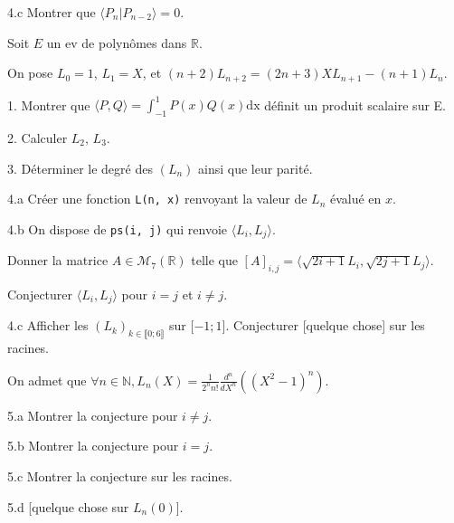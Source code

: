 \vspace{5pt}
4.c  Montrer que $\langle P_n | P_{n-2} \rangle = 0$.



\subetoiles
\columnbreak



\noindent Soit $E$ un ev de polynômes dans $\mathbb{R}$.

\noindent On pose $L_0 = 1$, $L_1 = X$, et $(n+2)L_{n+2} = (2n+3)XL_{n+1} - (n+1)L_n$.

\vspace{5pt}
1. Montrer que $\displaystyle \langle P, Q\rangle = \int_{-1}^{1} P(x)Q(x)\mathrm{dx}$ définit un produit scalaire sur E.

\vspace{5pt}
2. Calculer $L_2$, $L_3$.

\vspace{5pt}
3. Déterminer le degré des $(L_n)$ ainsi que leur parité.

\vspace{5pt}
4.a Créer une fonction \lstinline {L(n, x)} renvoyant la valeur de $L_n$ évalué en $x$.

\vspace{5pt}
4.b On dispose de \lstinline {ps(i, j)} qui renvoie $\langle L_i, L_j\rangle$.

Donner la matrice $A \in \mathcal{M}_7(\mathbb{R})$ telle que
$[A]_{i,j} = \langle\sqrt{2i+1}L_i, \sqrt{2j+1}L_j\rangle$.

Conjecturer $\langle L_i, L_j\rangle$ pour $i=j$ et $i \neq j$.

\vspace{5pt}
4.c Afficher les $(L_k)_{k \in \llbracket 0;6 \rrbracket}$ sur $\lbrack -1;1 \rbrack$.
Conjecturer [quelque chose] sur les racines.

\vspace{5pt}
\noindent On admet que
$\displaystyle \forall n \in \mathbb{N}, L_n(X) = \frac {1} {2^nn!} \frac {d^n} {dX^n} \left( (X^2-1)^n \right)$.

\vspace{5pt}
5.a Montrer la conjecture pour $i \neq j$.

\vspace{5pt}
5.b Montrer la conjecture pour $i = j$.

\vspace{5pt}
5.c Montrer la conjecture sur les racines.

\vspace{5pt}
5.d [quelque chose sur $L_n(0)$].



